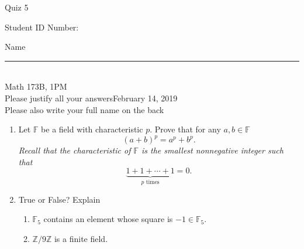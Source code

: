 \documentclass[12pt]{article}
\begin{document}
\begin{flushleft} 
\centerline{\LARGE{Quiz 5}} 
\vspace{5 mm}
{Student ID Number:}\hfill  
{Name \rule {2 in}{0.01in}}\\
Math 173B, 1PM
\\
{Please justify all your answers}\hfill {February 14, 2019}
\\
{Please also write your full name on the back} 

\medskip
\end{flushleft}

\begin{enumerate}
	\item Let $\mathbb{F}$ be a field with characteristic $p$. Prove that for any $a,b\in \mathbb{F}$
	\[
	(a+b)^p = a^p + b^p.
	\]
	\textit{Recall that the characteristic of $\mathbb{F}$ is the smallest nonnegative integer such that}
	\[
	\underbrace{1+1+\cdots+1}_{p\text{ times}} = 0.
	\]
	\vfillcon

	\item True or False? Explain
	\begin{enumerate}
		\item $\mathbb{F}_5$ contains an element whose square is $-1\in \mathbb{F}_5$.
		\vfill
		\item $\mathbb{Z}/9\mathbb{Z}$ is a finite field.
		\vfill
	\end{enumerate}
\end{enumerate}


\end{document}
